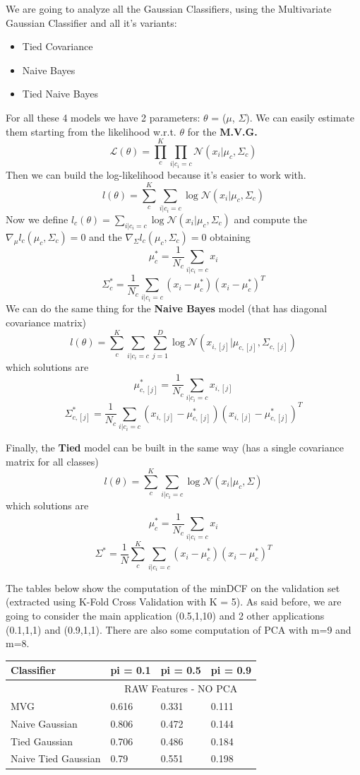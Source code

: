 \documentclass[english]{report}
\begin{document}
We are going to analyze all the Gaussian Classifiers, using the Multivariate Gaussian Classifier and all it's variants: 
\begin{itemize}
    \item Tied Covariance
    \item Naive Bayes
    \item Tied Naive Bayes
\end{itemize}

For all these 4 models we have 2 parameters: $\theta$ = ($\mu$, $\Sigma$). We can easily estimate them starting
from the likelihood w.r.t. $\theta$ for the \textbf{M.V.G.}
\[ \mathcal{L} (\theta) = \prod_{c}^{K}\prod_{i|c_i=c} \mathcal{N} (x_i|\mu_c,\Sigma_c)\]
Then we can build the log-likelihood because it's easier to work with.
\[ l (\theta) = \sum_{c}^{K}\sum_{i|c_i=c} \log \mathcal{N} (x_i|\mu_c,\Sigma_c)\]
Now we define \( l_c (\theta) = \sum_{i|c_i=c} \log \mathcal{N} (x_i|\mu_c,\Sigma_c)\) and compute
the $\nabla_\mu l_c(\mu_c,\Sigma_c) = 0$ and the $\nabla_\Sigma l_c(\mu_c,\Sigma_c) = 0$ 
obtaining 
\[\mu_c^* = \frac{1}{N_c}\sum_{i|c_i=c}x_i\]
\[\Sigma_c^* = \frac{1}{N_c}\sum_{i|c_i=c}(x_i-\mu_c^*)(x_i-\mu_c^*)^T\]
We can do the same thing for the \textbf{Naive Bayes} model (that has diagonal covariance matrix)
\[ l (\theta) = \sum_{c}^{K}\sum_{i|c_i=c}\sum_{j=1}^{D} \log \mathcal{N} (x_{i,[j]}|\mu_{c,[j]},\Sigma_{c,[j]})\]
which solutions are
\[\mu_{c,[j]}^* = \frac{1}{N_c}\sum_{i|c_i=c}x_{i,[j]}\] 
\[\Sigma_{c,[j]}^* = \frac{1}{N_c}\sum_{i|c_i=c}(x_{i,[j]}-\mu_{c,[j]}^*)(x_{i,[j]}-\mu_{c,[j]}^*)^T\] 

Finally, the \textbf{Tied} model can be built in the same way (has a single covariance matrix for all classes)
\[ l (\theta) = \sum_{c}^{K}\sum_{i|c_i=c} \log \mathcal{N} (x_i|\mu_c,\Sigma)\]
which solutions are
\[\mu_{c}^* = \frac{1}{N_c}\sum_{i|c_i=c}x_{i}\] 
\[\Sigma^* = \frac{1}{N}\sum_{c}^{K}\sum_{i|c_i=c}(x_{i}-\mu_{c}^*)(x_{i}-\mu_{c}^*)^T\] 

The tables below show the computation of the minDCF on the validation set (extracted using K-Fold Cross Validation with K = 5).
As said before, we are going to consider the main application (0.5,1,10) and 2 other applications (0.1,1,1) and (0.9,1,1).
There are also some computation of PCA with m=9 and m=8.

\begin{table}[H]
    \centering
    \begin{tabular}{@{}llll@{}}
    \toprule
    Classifier          & pi = 0.1  & pi = 0.5  & pi = 0.9 \\ \midrule
                        & \multicolumn{3}{c}{RAW Features - NO PCA} \\ \midrule
    MVG                 & 0.616     & 0.331     & 0.111    \\
    Naive Gaussian      & 0.806     & 0.472     & 0.144    \\
    Tied Gaussian       & 0.706     & 0.486     & 0.184    \\
    Naive Tied Gaussian & 0.79      & 0.551     & 0.198    \\ \bottomrule
    \end{tabular}
    \label{tab:MVG_RAW_valid}
\end{table}
\end{document}
